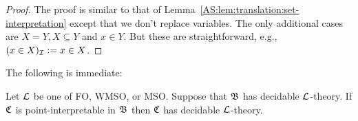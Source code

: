 \begin{proof}
The proof is similar to that of Lemma~\ref{AS:lem:translation:set-interpretation} except that we don't replace variables. The only additional cases are $X = Y, X \subseteq Y$ and $x \in Y$. But these are straightforward, e.g., $(x \in X)_{\mathcal I} := x \in X$.
\end{proof}



The following is immediate:

\begin{proposition}
Let ${\mathcal L}$ be one of FO, WMSO, or MSO. Suppose that $\mathfrak{B}$ has decidable ${\mathcal L}$-theory. 
If $\mathfrak{C}$ is point-interpretable in $\mathfrak{B}$ then $\mathfrak{C}$ has decidable ${\mathcal L}$-theory.
\end{proposition}



% 
% 

